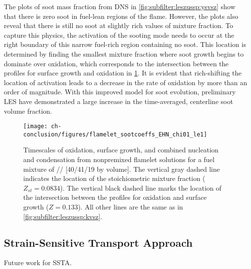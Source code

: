 The plots of soot mass fraction from DNS in \cref{fig:subfilter:leszussp:ysvsz} show that there is zero soot in fuel-lean regions of the flame. However, the plots also reveal that there is still no soot at slightly rich values of mixture fraction. To capture this physics, the activation of the sooting mode needs to occur at the right boundary of this narrow fuel-rich region containing no soot. This location is determined by finding the smallest mixture fraction where soot growth begins to dominate over oxidation, which corresponds to the intersection between the profiles for surface growth and oxidation in \cref{fig:conclusion:future:zassp:shiftedz}. It is evident that rich-shifting the location of activation leads to a decrease in the rate of oxidation by more than an order of magnitude. With this improved model for soot evolution, preliminary LES have demonstrated a large increase in the time-averaged, centerline soot volume fraction.

\begin{figure}[htb]
  \centering
  \texttt{[image: ch-conclusion/figures/flamelet\_sootcoeffs\_EHN\_chi01\_le1]}
  \caption[Shifted Activation of ZASSP]{Timescales of oxidation, surface growth, and combined nucleation and condensation from nonpremixed flamelet solutions for a fuel mixture of // [40/41/19 by volume]. The vertical gray dashed line indicates the location of the stoichiometric mixture fraction ($Z_{st} = 0.0834$). The vertical black dashed line marks the location of the intersection between the profiles for oxidation and surface growth ($Z = 0.133$). All other lines are the same as in \cref{fig:subfilter:leszussp:kvsz}.}
  \label{fig:conclusion:future:zassp:shiftedz}
\end{figure}


\subsection{Strain-Sensitive Transport Approach}
\label{sec:conclusion:future:ssta}

Future work for SSTA.
